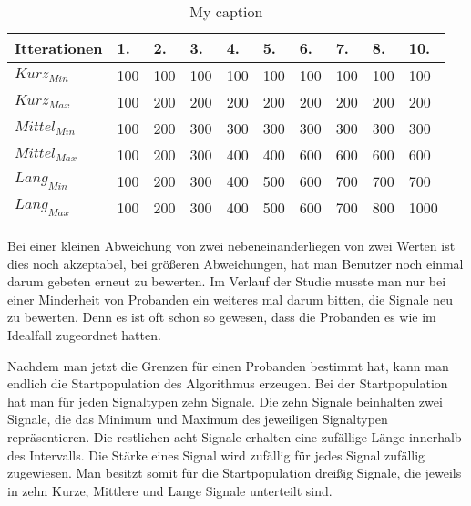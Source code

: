 \begin{table}[]
\centering
\caption{My caption}
\label{my-label}
\begin{tabular}{|l|l|l|l|l|l|l|l|l|l|}
\hline
Itterationen            & 1. & 2. & 3. & 4. & 5. & 6. & 7. & 8. & 10. \\ \hline
$Kurz_{Min}$   & 100          & 100          & 100          & 100          & 100          & 100          & 100          & 100          & 100           \\ \hline
$Kurz_{Max}$   & 100          & 200          & 200          & 200          & 200          & 200          & 200          & 200          & 200           \\ \hline
$Mittel_{Min}$ & 100          & 200          & 300          & 300          & 300          & 300          & 300          & 300          & 300           \\ \hline
$Mittel_{Max}$ & 100          & 200          & 300          & 400          & 400          & 600          & 600          & 600          & 600           \\ \hline
$Lang_{Min}$   & 100          & 200          & 300          & 400          & 500          & 600          & 700          & 700          & 700           \\ \hline
$Lang_{Max}$   & 100          & 200          & 300          & 400          & 500          & 600          & 700          & 800          & 1000          \\ \hline
\end{tabular}
\end{table}

Bei einer kleinen Abweichung von zwei nebeneinanderliegen von zwei Werten ist dies noch akzeptabel, bei gr{\"o}{\ss}eren Abweichungen, hat man Benutzer noch einmal darum gebeten erneut zu bewerten. Im Verlauf der Studie musste man nur bei einer Minderheit von Probanden ein weiteres mal darum bitten, die Signale neu zu bewerten. Denn es ist oft schon so gewesen, dass die Probanden es wie im Idealfall zugeordnet hatten.

Nachdem man jetzt die Grenzen f{\"u}r einen Probanden bestimmt hat, kann man endlich die Startpopulation des Algorithmus erzeugen. 
Bei der Startpopulation hat man f{\"u}r jeden Signaltypen zehn Signale. 
Die zehn Signale beinhalten zwei Signale, die das Minimum und Maximum des jeweiligen Signaltypen repr{\"a}sentieren. Die restlichen acht Signale erhalten eine zuf{\"a}llige L{\"a}nge innerhalb des Intervalls. Die St{\"a}rke eines Signal wird zuf{\"a}llig f{\"u}r jedes Signal zuf{\"a}llig zugewiesen. 
Man besitzt somit f{\"u}r die Startpopulation drei{\ss}ig Signale, die jeweils in zehn Kurze, Mittlere und Lange Signale unterteilt sind. 


